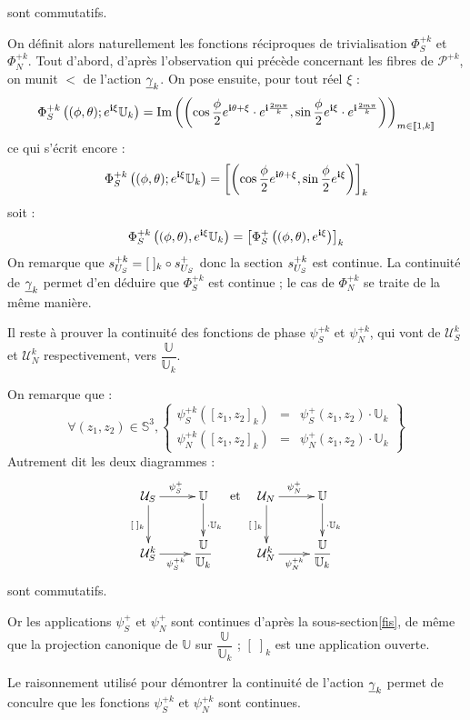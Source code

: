 sont commutatifs.
\par
On d\'efinit alors naturellement les fonctions r\'eciproques de trivialisation $\Phi_S^{+k}$ et $\Phi_N^{+k}$. %
Tout d'abord, d'apr\`es l'observation qui pr\'ec\`ede concernant les fibres de $\mathcal{P}^{+k}$, on munit $\lt$ de l'action $\underline{\gamma}_{k}$. %
On pose ensuite, pour tout r\'eel $\xi$ :
\[\Phi_S^{+k}\left((\phi,\theta);e^{\mathbf{i}\xi}\mathbb{U}_k\right)=\text{Im}\left(\left(\cos\frac{\phi}{2}e^{\mathbf{i}\theta+\xi}\cdot e^{\mathbf{i}\frac{2m\pi}{k}} ,\sin\frac{\phi}{2}e^{\mathbf{i}\xi}\cdot e^{\mathbf{i}\frac{2m\pi}{k}}\right)\right)_{m\in[\![1,k]\!]}\]
ce qui s'\'ecrit encore :
\[\Phi_S^{+k}\left((\phi,\theta);e^{\mathbf{i}\xi}\mathbb{U}_k\right)=\left[\left(\cos\dfrac{\phi}{2}e^{\mathbf{i}\theta+\xi},\sin\dfrac{\phi}{2}e^{\mathbf{i}\xi}\right)\right]_k\]
soit :
\[\Phi_S^{+k}\left((\phi,\theta),e^{\mathbf{i}\xi}\mathbb{U}_k\right)=\left[\Phi_S^+\left((\phi,\theta),e^{\mathbf{i}\xi}\right)\right]_k\]
On remarque que $s_{U_{S}}^{+k}=[\; ]_k\circ s_{U_{S}}^{+}$ donc la section $s_{U_{S}}^{+k}$ est continue. %
La continuit\'e de $\underline{\gamma}_{k}$ permet d'en d\'eduire que $\Phi_S^{+k}$ est continue ; le cas de $\Phi_N^{+k}$ se traite de la m\^eme mani\`ere.
\par
Il reste \`a prouver la continuit\'e des fonctions de phase $\psi_S^{+k}$ et $\psi_N^{+k}$, %
qui vont de $\mathcal{U}_S^k$ et $\mathcal{U}_N^k$ respectivement, vers $\dfrac{\mathbb{U}}{\mathbb{U}_k}$.
\par
On remarque que : \[\forall (z_1,z_2)\in\mathbb{S}^3 , %
\left\{\begin{array}{lcr}%
\psi_S^{+k}\left(\left[z_1,z_2\right]_k\right)&=&\psi_S^+(z_1,z_2)\cdot\mathbb{U}_k\\%
\psi_N^{+k}\left(\left[z_1,z_2\right]_k\right)&=&\psi_N^+(z_1,z_2)\cdot\mathbb{U}_k%
\end{array}\right\}\]
Autrement dit les deux diagrammes :
\[%
\xymatrix{\mathcal{U}_S\ar[d]_{[\; ]_k}\ar[r]^{\psi_S^+}&\mathbb{U}\ar[d]^{\cdot\mathbb{U}_k}\\%
\mathcal{U}_S^k\ar[r]_{\psi_S^{+k}}&\dfrac{\mathbb{U}}{\mathbb{U}_k}%
}%
\text{ et }%
\xymatrix{\mathcal{U}_N\ar[d]_{[\; ]_k}\ar[r]^{\psi_N^+}&\mathbb{U}\ar[d]^{\cdot\mathbb{U}_k}\\%
\mathcal{U}_N^k\ar[r]_{\psi_N^{+k}}&\dfrac{\mathbb{U}}{\mathbb{U}_k}%
}%
\]
sont commutatifs.
\par
Or les applications $\psi_S^+$ et $\psi_N^+$ sont continues d'apr\`es la sous-section\ref{fis}, %
de m\^eme que la projection canonique de $\mathbb{U}$ sur $\dfrac{\mathbb{U}}{\mathbb{U}_k}$ ; %
$[\; ]_k$ est une application ouverte.
\par
Le raisonnement utilis\'e pour d\'emontrer la continuit\'e de l'action $\underline{\gamma}_{k}$ permet de conculre que les fonctions $\psi_S^{+k}$ et $\psi_N^{+k}$ sont continues.
